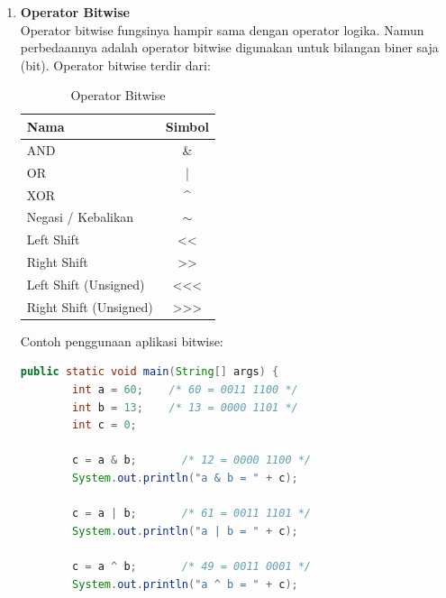 \begin{enumerate}
    \item \textbf{Operator Bitwise}\\
    Operator bitwise fungsinya hampir sama dengan operator logika. Namun perbedaannya adalah operator bitwise digunakan untuk bilangan biner saja (bit). Operator bitwise terdir dari:
    \begin{table}[h!]
        \centering
        \begin{tabular}{|l|c|}
        \hline
        \rowcolor[HTML]{9AFF99} 
        \textbf{Nama}          & \multicolumn{1}{l|}{\cellcolor[HTML]{9AFF99}\textbf{Simbol}} \\ \hline
        AND                    & \&                                                           \\ \hline
        OR                     & |                                                            \\ \hline
        XOR                    & \textasciicircum{}                                           \\ \hline
        Negasi / Kebalikan     & $\sim$                                                       \\ \hline
        Left Shift             & \textless{}\textless{}                                       \\ \hline
        Right Shift            & \textgreater{}\textgreater{}                                 \\ \hline
        Left Shift (Unsigned)  & \textless{}\textless{}\textless{}                            \\ \hline
        Right Shift (Unsigned) & \textgreater{}\textgreater{}\textgreater{}                   \\ \hline
        \end{tabular}
        \caption{Operator Bitwise}
    \end{table}
    \newline
    Contoh penggunaan aplikasi bitwise:
    \begin{lstlisting}[language=Java]
        public static void main(String[] args) {
        int a = 60;    /* 60 = 0011 1100 */
        int b = 13;    /* 13 = 0000 1101 */
        int c = 0;

        c = a & b;       /* 12 = 0000 1100 */
        System.out.println("a & b = " + c);

        c = a | b;       /* 61 = 0011 1101 */
        System.out.println("a | b = " + c);

        c = a ^ b;       /* 49 = 0011 0001 */
        System.out.println("a ^ b = " + c);


\end{lstlisting}
\end{enumerate}
